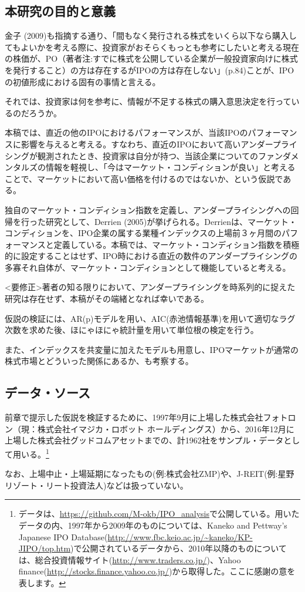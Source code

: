 \documentclass{jsarticle}
\begin{document}
\subsection{本研究の目的と意義}
金子 (2009)\cite{kaneko}も指摘する通り、「間もなく発行される株式をいくら以下なら購入してもよいかを考える際に、投資家がおそらくもっとも参考にしたいと考える現在の株価が、PO（著者注:すでに株式を公開している企業が一般投資家向けに株式を発行すること）の方は存在するがIPOの方は存在しない」(p.84)ことが、IPOの初値形成における固有の事情と言える。\par
それでは、投資家は何を参考に、情報が不足する株式の購入意思決定を行っているのだろうか。\par
本稿では、直近の他のIPOにおけるパフォーマンスが、当該IPOのパフォーマンスに影響を与えると考える。すなわち、直近のIPOにおいて高いアンダープライシングが観測されたとき、投資家は自分が持つ、当該企業についてのファンダメンタルズの情報を軽視し、「今はマーケット・コンディションが良い」と考えることで、マーケットにおいて高い価格を付けるのではないか、という仮説である。\par
独自のマーケット・コンディション指数を定義し、アンダープライシングへの回帰を行った研究として、Derrien (2005)\cite{Derrien}が挙げられる。Derrienは、マーケット・コンディションを、IPO企業の属する業種インデックスの上場前３ヶ月間のパフォーマンスと定義している。本稿では、マーケット・コンディション指数を積極的に設定することはせず、IPO時における直近の数件のアンダープライシングの多寡それ自体が、マーケット・コンディションとして機能していると考える。\par
<要修正>著者の知る限りにおいて、アンダープライシングを時系列的に捉えた研究は存在せず、本稿がその端緒となれば幸いである。\par
仮説の検証には、AR(p)モデルを用い、AIC(赤池情報基準)を用いて適切なラグ次数を求めた後、ほにゃほにゃ統計量を用いて単位根の検定を行う。\par
また、インデックスを共変量に加えたモデルも用意し、IPOマーケットが通常の株式市場とどういった関係にあるか、も考察する。

\subsection{データ・ソース}
前章で提示した仮説を検証するために、1997年9月に上場した株式会社フォトロン（現：株式会社イマジカ・ロボット ホールディングス）から、2016年12月に上場した株式会社グッドコムアセットまでの、計1962社をサンプル・データとして用いる。\footnote[7]{データは、\url{https://github.com/M-okb/IPO_analysis}で公開している。用いたデータの内、1997年から2009年のものについては、Kaneko and Pettway’s Japanese IPO Database(\url{http://www.fbc.keio.ac.jp/~kaneko/KP-JIPO/top.htm})で公開されているデータから、2010年以降のものについては、総合投資情報サイト(\url{http://www.traders.co.jp/})、Yahoo finance(\url{http://stocks.finance.yahoo.co.jp/})から取得した。ここに感謝の意を表します。}\par
なお、上場中止・上場延期になったもの(例:株式会社ZMP)や、J-REIT(例:星野リゾート・リート投資法人)などは扱っていない。\par
\end{document}
